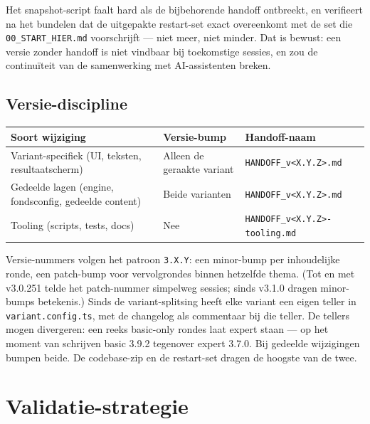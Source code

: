 \documentclass[11pt,a4paper]{article}
\newcommand{\code}[1]{\texttt{#1}}
\begin{document}
Het snapshot-script faalt hard als de bijbehorende handoff ontbreekt, en verifieert na het bundelen dat de uitgepakte restart-set exact overeenkomt met de set die \code{00\_START\_HIER.md} voorschrijft --- niet meer, niet minder. Dat is bewust: een versie zonder handoff is niet vindbaar bij toekomstige sessies, en zou de continu\"iteit van de samenwerking met AI-assistenten breken.

\subsection{Versie-discipline}
\label{sec:versie}

\begin{longtable}{@{}>{\raggedright\arraybackslash}p{}>{\raggedright\arraybackslash}p{}>{\raggedright\arraybackslash}p{}@{}}
\toprule
\textbf{Soort wijziging} & \textbf{Versie-bump} & \textbf{Handoff-naam} \\
\midrule
\endhead
Variant-specifiek (UI, teksten, resultaatscherm) & Alleen de geraakte variant & \code{HANDOFF\_v\textless X.Y.Z\textgreater.md} \\
Gedeelde lagen (engine, fondsconfig, gedeelde content) & Beide varianten & \code{HANDOFF\_v\textless X.Y.Z\textgreater.md} \\
Tooling (scripts, tests, docs) & Nee & \code{HANDOFF\_v\textless X.Y.Z\textgreater}\allowbreak\code{-tooling.md} \\
\bottomrule
\end{longtable}

Versie-nummers volgen het patroon \code{3.X.Y}: een minor-bump per inhoudelijke ronde, een patch-bump voor vervolgrondes binnen hetzelfde thema. (Tot en met v3.0.251 telde het patch-nummer simpelweg sessies; sinds v3.1.0 dragen minor-bumps betekenis.) Sinds de variant-splitsing heeft elke variant een eigen teller in \code{variant.config.ts}, met de changelog als commentaar bij die teller. De tellers mogen divergeren: een reeks basic-only rondes laat expert staan --- op het moment van schrijven basic 3.9.2 tegenover expert 3.7.0. Bij gedeelde wijzigingen bumpen beide. De codebase-zip en de restart-set dragen de hoogste van de twee.

\section{Validatie-strategie}
\label{sec:validatie}
\end{document}
